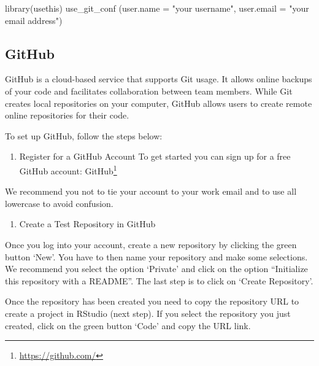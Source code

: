 \documentclass[
]{krantz}
\makeatletter
\newenvironment{Shaded}{\begin{snugshade}}{\end{snugshade}}
\newcommand{\AttributeTok}[1]{\textcolor[rgb]{0.61,0.61,0.61}{#1}}
\newcommand{\FunctionTok}[1]{\textcolor[rgb]{0,0,0}{#1}}
\newcommand{\NormalTok}[1]{#1}
\newcommand{\StringTok}[1]{\textcolor[rgb]{0.5,0.5,0.5}{#1}}
\providecommand{\tightlist}{%
  \setlength{\itemsep}{0pt}\setlength{\parskip}{0pt}}
\renewcommand{\href}[2]{#2\footnote{\url{#1}}}
\newenvironment{kframe}{%
\medskip{}
\setlength{\fboxsep}{.8em}
 \def\at@end@of@kframe{}%
 \ifinner\ifhmode%
  \def\at@end@of@kframe{\end{minipage}}%
  \begin{minipage}{\columnwidth}%
 \fi\fi%
 \def\FrameCommand##1{\hskip\@totalleftmargin \hskip-\fboxsep
 \colorbox{shadecolor}{##1}\hskip-\fboxsep
     \hskip-\linewidth \hskip-\@totalleftmargin \hskip\columnwidth}%
 \MakeFramed {\advance\hsize-\width
   \@totalleftmargin\z@ \linewidth\hsize
   \@setminipage}}%
 {\par\unskip\endMakeFramed%
 \at@end@of@kframe}
\renewenvironment{Shaded}{\begin{kframe}}{\end{kframe}}
\makeatother
\begin{document}
\begin{Shaded}
\begin{Highlighting}[]
\FunctionTok{library}\NormalTok{(usethis)}
\FunctionTok{use\_git\_conf}\NormalTok{ (}\AttributeTok{user.name =} \StringTok{"your username"}\NormalTok{, }
              \AttributeTok{user.email =} \StringTok{"your email address"}\NormalTok{)}
\end{Highlighting}
\end{Shaded}

\hypertarget{github}{%
\subsection{GitHub}\label{github}}

GitHub is a cloud-based service that supports Git usage. It allows online backups of your code and facilitates collaboration between team members. While Git creates local repositories on your computer, GitHub allows users to create remote online repositories for their code.

To set up GitHub, follow the steps below:

\begin{enumerate}
\def\labelenumi{\arabic{enumi})}
\tightlist
\item
  Register for a GitHub Account
  To get started you can sign up for a free GitHub account: \href{https://github.com/}{GitHub}
\end{enumerate}

We recommend you not to tie your account to your work email and to use all lowercase to avoid confusion.

\begin{enumerate}
\def\labelenumi{\arabic{enumi})}
\setcounter{enumi}{1}
\tightlist
\item
  Create a Test Repository in GitHub
\end{enumerate}

Once you log into your account, create a new repository by clicking the green button `New'. You have to then name your repository and make some selections. We recommend you select the option `Private' and click on the option ``Initialize this repository with a README''. The last step is to click on `Create Repository'.

Once the repository has been created you need to copy the repository URL to create a project in RStudio (next step). If you select the repository you just created, click on the green button `Code' and copy the URL link.
\end{document}
